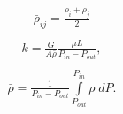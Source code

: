 \documentclass[a4paper,12pt,russian]{extreport}
\begin{document}
%
\begin{eqnarray}
\begin{gathered}
\bar{\rho}_{ij} = \frac{\rho_{i}+\rho_{j}}{2}
\end{gathered}
\end{eqnarray}
%
\begin{eqnarray}
\begin{gathered}
k = \frac{G}{A \bar{\rho}} \frac{\mu L}{P_{in} - P_{out}},
\end{gathered}
\end{eqnarray}
%
\begin{eqnarray}
\begin{gathered}
 \bar{\rho}=\frac{1}{P_{in}-P_{out}} \int\limits^{P_{in}}_{P_{out}}\rho \; dP.
\end{gathered}
\end{eqnarray}
\end{document}

